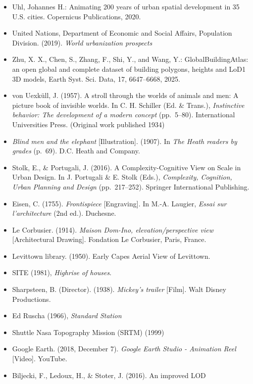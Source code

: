 \documentclass[
  letterpaper,
  DIV=11,
  numbers=noendperiod]{scrreprt}
\providecommand{\tightlist}{%
  \setlength{\itemsep}{0pt}\setlength{\parskip}{0pt}}
\begin{document}
\begin{itemize}
\tightlist
\item
  Uhl, Johannes H.: Animating 200 years of urban spatial development in
  35 U.S. cities. Copernicus Publications, 2020.
\item
  United Nations, Department of Economic and Social Affairs, Population
  Division. (2019). \emph{World urbanization prospects}
\item
  Zhu, X. X., Chen, S., Zhang, F., Shi, Y., and Wang, Y.:
  GlobalBuildingAtlas: an open global and complete dataset of building
  polygons, heights and LoD1 3D models, Earth Syst. Sci. Data, 17,
  6647--6668, 2025.
\item
  von Uexküll, J. (1957). A stroll through the worlds of animals and
  men: A picture book of invisible worlds. In C. H. Schiller (Ed. \&
  Trans.), \emph{Instinctive behavior: The development of a modern
  concept} (pp.~5--80). International Universities Press. (Original work
  published 1934)
\item
  \emph{Blind men and the elephant} {[}Illustration{]}. (1907). In
  \emph{The Heath readers by grades} (p.~69). D.C. Heath and Company.
\item
  Stolk, E., \& Portugali, J. (2016). A Complexity-Cognitive View on
  Scale in Urban Design. In J. Portugali \& E. Stolk (Eds.),
  \emph{Complexity, Cognition, Urban Planning and Design}
  (pp.~217--252). Springer International Publishing.
\item
  Eisen, C. (1755). \emph{Frontispiece} {[}Engraving{]}. In M.-A.
  Laugier, \emph{Essai sur l'architecture} (2nd ed.). Duchesne.
\item
  Le Corbusier. (1914). \emph{Maison Dom-Ino, elevation/perspective
  view} {[}Architectural Drawing{]}. Fondation Le Corbusier, Paris,
  France.
\item
  Levittown library. (1950). Early Capes Aerial View of Levittown.
\item
  SITE (1981), \emph{Highrise of houses}.
\item
  Sharpsteen, B. (Director). (1938). \emph{Mickey's trailer} {[}Film{]}.
  Walt Disney Productions.
\item
  Ed Ruscha (1966), \emph{Standard Station}
\item
  Shuttle Nasa Topography Mission (SRTM) (1999)
\item
  Google Earth. (2018, December 7). \emph{Google Earth Studio -
  Animation Reel} {[}Video{]}. YouTube.
\item
  Biljecki, F., Ledoux, H., \& Stoter, J. (2016). An improved LOD

\end{itemize}
\end{document}
